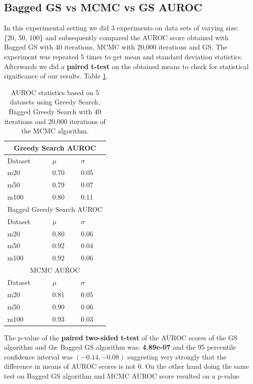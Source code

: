 \documentclass{article}
\begin{document}
	\subsection{Bagged GS vs MCMC vs GS AUROC}
	In this experimental setting we did 3 experiments on data sets of varying
	size: \{20, 50, 100\} and subsequently compared the AUROC score obtained with
	Bagged GS with 40 iterations, MCMC with 20,000 iterations and GS. The
	experiment was repeated 5 times to get mean and standard deviation
	statistics. Afterwards we did a \textbf{paired t-test} on the obtained means
	to check for statistical significance of our results.
	Table \ref{tabla:iBest}.
	\begin{table}[ht]
		\centering
		\begin{tabular}{ |p{3cm}||p{3cm}|p{3cm}|}
		 \hline
		 \multicolumn{3}{|c|}{Greedy Search AUROC} \\
		 \hline
		 Dataset & $\mu$ & $\sigma$ \\
		 \hline
		 m20 & 0.70 & 0.05 \\
		 m50 & 0.79  & 0.07 \\
		 m100 & 0.80 & 0.11 \\
		 \hline
		 \multicolumn{3}{|c|}{Bagged Greedy Search AUROC} \\
		 \hline
		 Dataset & $\mu$ & $\sigma$ \\
		 \hline
		 m20 & 0.80 & 0.06 \\
		 m50 & 0.92  & 0.04 \\
		 m100 & 0.92 & 0.06 \\
		 \hline
		 \multicolumn{3}{|c|}{MCMC AUROC} \\
		 \hline
		 Dataset & $\mu$ & $\sigma$ \\
		 \hline
		 m20 & 0.81 & 0.05 \\
		 m50 & 0.90  & 0.06 \\
		 m100 & 0.93 & 0.03 \\
		 \hline
		\end{tabular}
		\caption{AUROC statistics based on 5 datasets using Greedy Search, Bagged
			Greedy Search with 40 iterations and 20,000 iterations of the MCMC algorithm.}
		\label{tabla:iBest}
	\end{table}
	The p-value of the \textbf{paired two-sided t-test} of the AUROC scores of the GS algorithm
	and the Bagged GS algorithm was: \textbf{4.89e-07} and the 95 percentile confidence
	interval was $(-0.14, -0.08)$ suggesting very strongly that the
	difference in means of AUROC scores is not 0. On the other hand doing the
	same test on Bagged GS algorithm and MCMC AUROC score resulted on a p-value
\end{document}
